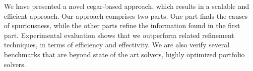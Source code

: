 We have presented a novel cegar-based approach, which results in a scalable and efficient approach.  Our approach comprises two parts. One part finds the causes of spuriousness, while the other parts refine  the information found in the first part. Experimental evaluation shows that we outperform related refinement techniques, in terms of efficiency and effectivity. We are also verify several benchmarks that are beyond state of the art solvers, highly optimized portfolio solvers.

